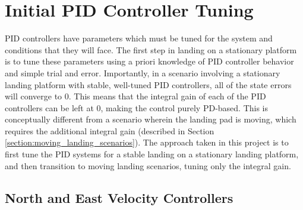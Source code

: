 

\section{Initial PID Controller Tuning}
\label{subsection:pid_tuning}


PID controllers have parameters which must be tuned for the system and conditions that they will face. The first step in landing on a stationary platform is to tune these parameters using a priori knowledge of PID controller behavior and simple trial and error. Importantly, in a scenario involving a stationary landing platform with stable, well-tuned PID controllers, all of the state errors will converge to 0. This means that the integral gain of each of the PID controllers can be left at 0, making the control purely PD-based. This is conceptually different from a scenario wherein the landing pad is moving, which requires the additional integral gain (described in Section \ref{section:moving_landing_scenarios}). The approach taken in this project is to first tune the PID systems for a stable landing on a stationary landing platform, and then transition to moving landing scenarios, tuning only the integral gain.

\subsection{North and East Velocity Controllers}

